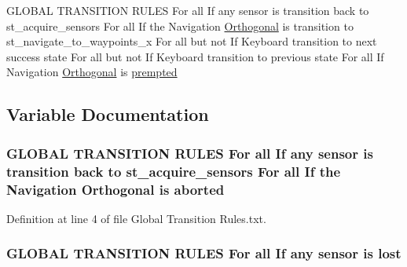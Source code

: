 \begin{DoxyCompactItemize}
\item 
G\+L\+O\+B\+AL T\+R\+A\+N\+S\+I\+T\+I\+ON R\+U\+L\+ES For all If any sensor is transition back to st\+\_\+acquire\+\_\+sensors For all If the Navigation \hyperlink{3_2docs_2Global_01Transition_01Rules_8txt_a2e1cdec29dad5013e514270d0a78fe22}{Orthogonal} is transition to st\+\_\+navigate\+\_\+to\+\_\+waypoints\+\_\+x For all but not If Keyboard transition to next success state For all but not If Keyboard transition to previous state For all If Navigation \hyperlink{3_2docs_2Global_01Transition_01Rules_8txt_a2e1cdec29dad5013e514270d0a78fe22}{Orthogonal} is \hyperlink{3_2docs_2Global_01Transition_01Rules_8txt_ac6583c64beac40f27e253c605d5d5b5b}{prempted}
\end{DoxyCompactItemize}


\subsection{Variable Documentation}
\subsubsection[{\texorpdfstring{aborted}{aborted}}]{\setlength{\rightskip}{0pt plus 5cm}G\+L\+O\+B\+AL T\+R\+A\+N\+S\+I\+T\+I\+ON R\+U\+L\+ES For all If any sensor is transition back to st\+\_\+acquire\+\_\+sensors For all If the Navigation {\bf Orthogonal} is aborted}\hypertarget{3_2docs_2Global_01Transition_01Rules_8txt_a682ac6cc3cf2eeec69ad3f310ae363ea}{}\label{3_2docs_2Global_01Transition_01Rules_8txt_a682ac6cc3cf2eeec69ad3f310ae363ea}


Definition at line 4 of file Global Transition Rules.\+txt.

\subsubsection[{\texorpdfstring{lost}{lost}}]{\setlength{\rightskip}{0pt plus 5cm}G\+L\+O\+B\+AL T\+R\+A\+N\+S\+I\+T\+I\+ON R\+U\+L\+ES For all If any sensor is lost}\hypertarget{3_2docs_2Global_01Transition_01Rules_8txt_a21166d43cc40d1ae31189d3fe91d8346}{}\label{3_2docs_2Global_01Transition_01Rules_8txt_a21166d43cc40d1ae31189d3fe91d8346}


